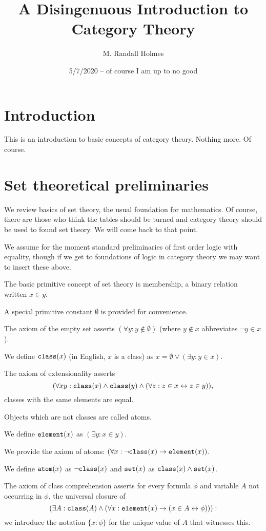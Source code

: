 \documentclass[12pt]{article}
\title{A Disingenuous Introduction to Category Theory}
\author{M. Randall Holmes}
\date{5/7/2020 -- of course I am up to no good}
\begin{document}
\maketitle

\section{Introduction}

This is an introduction to basic concepts of category theory.  Nothing more.  Of course.

\section{Set theoretical preliminaries}

We review basics of set theory, the usual foundation for mathematics.  Of course, there are those who think the tables should be turned and category theory should be used to found set theory.  We will come back to that point.

We assume for the moment standard preliminaries of first order logic with equality, though if we get to foundations of logic in category theory we may want to insert these above.

The basic primitive concept of set theory is membership, a binary relation written $x \in y$.

A special primitive constant $\emptyset$ is provided for convenience.  

The axiom of the empty set asserts $(\forall y: y \not\in \emptyset)$ (where $y \not\in x$ abbreviates $\neg y \in x$).

We define ${\tt class}(x)$ (in English, $x$ is a class) as $x = \emptyset \vee (\exists y: y \in x)$.

The axiom of extensionality asserts $$(\forall xy: {\tt class}(x) \wedge {\tt class}(y)  \wedge (\forall z:z \in x \leftrightarrow z \in y)),$$ classes with the same elements are equal.

Objects which are not classes are called atoms.

We define ${\tt element}(x)$ as $(\exists y:x \in y)$. 

We provide the axiom of atoms:  $(\forall x:\neg{\tt class}(x) \rightarrow {\tt element}(x)).$

We define ${\tt atom}(x)$ as $\neg{\tt class}(x)$ and ${\tt set}(x)$ as ${\tt class}(x) \wedge {\tt set}(x)$.

The axiom of class comprehension asserts for every formula $\phi$ and variable $A$ not occurring in $\phi$, the universal closure of $$(\exists A: {\tt class}(A) \wedge  (\forall x: {\tt element}(x) \rightarrow (x \in A \leftrightarrow \phi))):$$  we introduce the notation $\{x : \phi\}$ for the unique value of $A$ that witnesses this.
\end{document}
